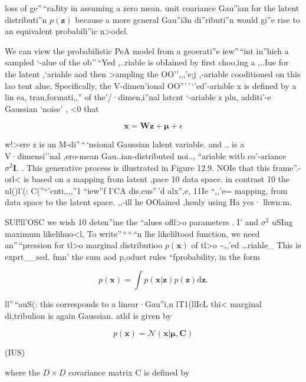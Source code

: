 \documentclass[
  10
]{article}
\begin{document}
loss of ge''\,``raJity in assuming a zero mean. unit
co\textquotesingle ariance Gau''ian for the latent distributi''n
\(p ( \mathbf { z } )\) because a more gcneral Gau''i3n di''ributi''n
would gi''e rise to an equivalent probabili''ic n\textgreater odel.

We can view the probabilistic PeA model from a geoerati''e
\textquotesingle iew''\,``int in''hich a sampled `-alue of the
ob''\,``Yed ,..riable is obIained by first choo,ing a ,..Iue for the
latent ,`ariahle aod then \textgreater ampling the OO'',,,'e;j ,-ariable
cooditioned on this lao tent \textquotesingle alue, Specifically, the
V-dimen'ional OO'''\,'\,`'ed'-ariable x is defined by a lin ea,
tran,formati,,'' of the'/·dimen,i''nal latcnt `-ariable z plu, additi'-e
Gaussian `noise' , \textless0 that

\[
\mathbf {x} = \mathbf {W} \mathbf {z} + \boldsymbol {\mu} + \epsilon\tag{12.33}
\]

w!\textgreater ere z is an M-di''\,``\,`nsional Gaussian lalent
variable. and .. is a V·dimensi''nal ,ero-mean Gau..ian-distributed
noi.., ``ariable witb co'-ariance \(\sigma ^ { 2 } \mathbf { I } .\) .
This generative process is illustrated in Figure 12.9. NOIe that this
frame''.-orl\textless{} is based on a mapping from latent ,pace 10 data
space. in contrast 10 the nl()l'(: C(''``'cnti,,,,''1 ``iew''f I'CA
dis.cus''\,'d alx'',e, 11Ie ``,,'e= mapping, from data space to the
latent space. ,,-ill he OOlained ,honly using Ha ycs· lhwn:m.

SUf!ll'OSC we wish 10 deten''ine the ``alues ofll\textgreater o
parameters \V. I' and \(\sigma ^ { 2 }\) uSIng maximum
likelihuo\textless l, To write''\,``\,``\,``n lhe likeliltood function,
we need an''\,``pression for tl\textgreater o marginal distributioo
\(p ( \mathbf { x } )\) of tl\textgreater o \textasciitilde,,'ed
\ldots riahle\_ This is exprt\_\_sed. fmn' the sum aod p,oduct rules
``fprobability, in the form

\[
p (\mathbf {x}) = \int p (\mathbf {x} | \mathbf {z}) p (\mathbf {z}) \mathrm{d} \mathbf {z}.\tag{12.34}
\]

ll''\,``auS(: this corresponds to a linear·Gau''i,n lT1(llIcL
thi\textless{} marginal di,tribulion is again Gaussian. atld is given by

\[
p (\mathbf {x}) = \mathcal {N} (\mathbf {x} | \boldsymbol {\mu}, \mathbf {C})
\]

(IUS)

where the \(D \times D\) covariance matrix C is defined by
\end{document}
